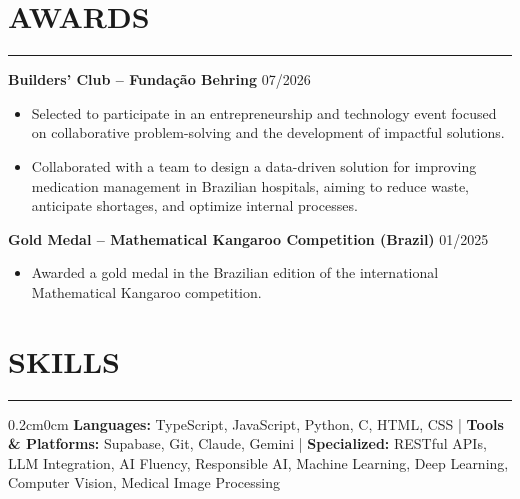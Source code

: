 \documentclass[10pt,a4paper]{article}
\begin{document}
\section*{AWARDS}
\vspace{-2.5mm}
\hrule
\vspace{1.2mm}

\noindent
\textbf{Builders' Club -- Fundação Behring}
\hfill 07/2026
\begin{itemize}[leftmargin=*,itemsep=-2pt,topsep=0pt,parsep=0pt,partopsep=0pt]
    \item Selected to participate in an entrepreneurship and technology
    event focused on collaborative problem-solving and the development
    of impactful solutions.

    \item Collaborated with a team to design a data-driven solution for
    improving medication management in Brazilian hospitals, aiming to
    reduce waste, anticipate shortages, and optimize internal processes.
\end{itemize}

\vspace{1mm}

\noindent
\textbf{Gold Medal -- Mathematical Kangaroo Competition (Brazil)}
\hfill 01/2025
\begin{itemize}[leftmargin=*,itemsep=-2pt,topsep=0pt,parsep=0pt,partopsep=0pt]
    \item Awarded a gold medal in the Brazilian edition of the
    international Mathematical Kangaroo competition.
\end{itemize}

\section*{SKILLS}
\vspace{-2.5mm}
\hrule
\vspace{1.2mm}

\begin{adjustwidth}{0.2cm}{0cm}
\textbf{Languages:} TypeScript, JavaScript, Python, C, HTML, CSS
\enspace | \enspace
\textbf{Tools \& Platforms:} Supabase, Git, Claude, Gemini
\enspace | \enspace
\textbf{Specialized:} RESTful APIs, LLM Integration, AI Fluency, Responsible AI, Machine Learning, Deep Learning, Computer Vision, Medical Image Processing
\end{adjustwidth}
\end{document}
